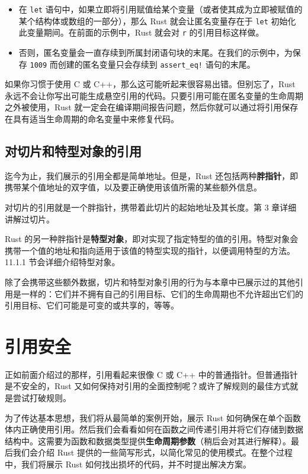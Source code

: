 \begin{itemize}
\item 在 \texttt{let} 语句中，如果立即将引用赋值给某个变量（或者使其成为立即被赋值的某个结构体或数组的一部分），那么 Rust 就会让匿名变量存在于 \texttt{let} 初始化此变量期间。在前面的示例中，Rust 就会对 \texttt{r} 的引用目标这样做。
\item 否则，匿名变量会一直存续到所属封闭语句块的末尾。在我们的示例中，为保存 \texttt{1009} 而创建的匿名变量只会存续到 \texttt{assert\_eq!} 语句的末尾。
\end{itemize}

如果你习惯于使用 C 或 C++，那么这可能听起来很容易出错。但别忘了，Rust 永远不会让你写出可能生成悬空引用的代码。只要引用可能在匿名变量的生命周期之外被使用，Rust 就一定会在编译期间报告问题，然后你就可以通过将引用保存在具有适当生命周期的命名变量中来修复代码。

\subsection{对切片和特型对象的引用}

迄今为止，我们展示的引用全都是简单地址。但是，Rust 还包括两种\textbf{胖指针}，即携带某个值地址的双字值，以及要正确使用该值所需的某些额外信息。

对切片的引用就是一个胖指针，携带着此切片的起始地址及其长度。第 3 章详细讲解过切片。

Rust 的另一种胖指针是\textbf{特型对象}，即对实现了指定特型的值的引用。特型对象会携带一个值的地址和指向适用于该值的特型实现的指针，以便调用特型的方法。11.1.1 节会详细介绍特型对象。

除了会携带这些额外数据，切片和特型对象引用的行为与本章中已展示过的其他引用是一样的：它们并不拥有自己的引用目标、它们的生命周期也不允许超出它们的引用目标、它们可能是可变的或共享的，等等。

\section{引用安全}

正如前面介绍过的那样，引用看起来很像 C 或 C++ 中的普通指针。但普通指针是不安全的，Rust 又如何保持对引用的全面控制呢？或许了解规则的最佳方式就是尝试打破规则。

为了传达基本思想，我们将从最简单的案例开始，展示 Rust 如何确保在单个函数体内正确使用引用。然后我们会看看如何在函数之间传递引用并将它们存储到数据结构中。这需要为函数和数据类型提供\textbf{生命周期参数}（稍后会对其进行解释）。最后我们会介绍 Rust 提供的一些简写形式，以简化常见的使用模式。在整个过程中，我们将展示 Rust 如何找出损坏的代码，并不时提出解决方案。

